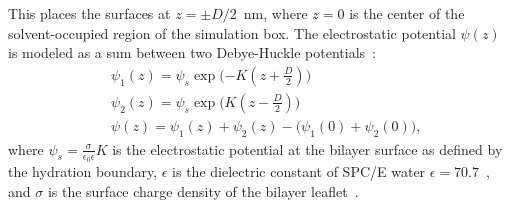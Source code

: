 \documentclass[12pt,openany,final]{book}
\begin{document}
This places the surfaces at $z=\pm D/2$~nm, where $z=0$ is the center of the solvent-occupied region of the simulation box.
The electrostatic potential $\psi(z)$ is modeled as a sum between two Debye-Huckle potentials~\cite{israelachvili:2011:intermol}:
\begin{align}
    &\psi_{1}(z) = \psi_s \exp\bigg({-K(z+\frac{D}{2})}\bigg)\\
    &\psi_{2}(z) = \psi_s \exp\bigg({K(z-\frac{D}{2})}\bigg)\\
    \label{eq:gcpot}
    &\psi(z) = \psi_1(z) + \psi_2(z) - \big({\psi_1(0)+\psi_2(0)}\big)\text{,}
\end{align}
where $\psi_s = \frac{\sigma}{\epsilon_0\epsilon} K$ is the electrostatic potential at the bilayer surface
as defined by the hydration boundary, $\epsilon$ 
is the dielectric constant of SPC/E water $\epsilon=70.7$~\cite{reddy:1989:dielectric}, and $\sigma$
is the surface charge density of the bilayer leaflet~\cite{israelachvili:2011:intermol}. 
\end{document}
